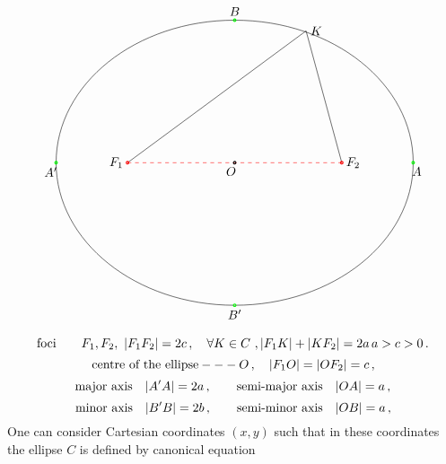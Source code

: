 \documentclass[12pt]{article}
\numberwithin{equation}{section}
\begin{document}
\begin{equation}\label{axesofellipse}
\begin{tikzpicture}

\draw (0,0) ellipse  (5 and 4);
\draw  (-3,0)--(2,3.7)--(3,0);
\node 
[right] 
at (2,3.7) {$K$};

\draw [dashed, red] (-3,0) -- (3,0);

\draw[red,thick] (-3,0) circle (1pt); 
\draw[red,thick] (3,0) circle (1pt); 
\node [left] at (-3,0) {$F_1$};
\node [right] at (3,0) {$F_2$};


\draw[thick] (0,0) circle (1pt); 
\node [below] at  (-0.1,0) {$O$}; %

\draw[thick,green] (5,0) circle (1pt); 
\node [below] at  (5.1,0) {$A$}; %

\draw[thick,green] (-5,0) circle (1pt); 
\node [below] at  (-5.15,0) {$A'$}; %

\draw[thick,green] (0,4) circle (1pt); 
\node [above] at  (0,4) {$B$}; %

\draw[thick,green] (0,-4) circle (1pt); 
\node [below] at  (0,-4) {$B'$}; %



\end{tikzpicture}
\end{equation}
   
          $$
\hbox{foci} \qquad F_1,F_2,\,\,|F_1F_2|=2c\,,
  \quad
 \forall K\in C\,\,,  |F_1K|+|KF_2|=2a\,
        a>c>0\,.  
        $$
        $$
\hbox {centre of the ellipse}---O\,,\quad
      |F_1O|=|OF_2|=c\,,
          $$
             $$
\hbox{major axis} \quad |A'A|=2a\,,\qquad
\hbox {semi-major axis}\quad  |OA|=a\,, 
          $$     
          $$
\hbox{minor  axis} \quad |B'B|=2b\,,\qquad
\hbox {semi-minor axis}\quad  |OB|=a\,, 
          $$    
One can consider Cartesian coordinates
$(x,y)$ such that in these coordinates
 the ellipse $C$ is defined by canonical equation
\end{document}
